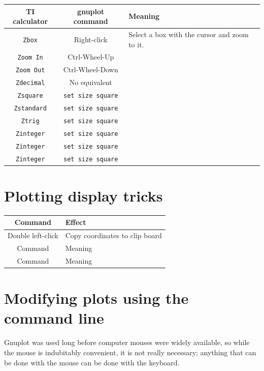 \documentclass[11pt,letterpaper]{report}
\begin{document}
\begin{center}
	\begin{tabular}{|c|c|l|}
	\hline 
	TI calculator & gnuplot command & Meaning \\ 
	\hline 
	\verb+Zbox+ & Right-click  & Select a box with the cursor and zoom to it. \\
	\hline
	\verb+Zoom In+ & Ctrl-Wheel-Up & \\
	\hline
	\verb+Zoom Out+ & Ctrl-Wheel-Down & \\
	\hline
	\verb+Zdecimal+ & No equivalent & \\
	\hline
	\verb+Zsquare+ & \lstinline+set size square+ & \\
	\hline
	\verb+Zstandard+ & \lstinline+set size square+ & \\
	\hline
	\verb+Ztrig+ & \lstinline+set size square+ & \\
	\hline
	\verb+Zinteger+ & \lstinline+set size square+ & \\
	\hline
	\verb+Zinteger+ & \lstinline+set size square+ & \\
	\hline
	\verb+Zinteger+ & \lstinline+set size square+ & \\
	\hline
	\end{tabular}
\end{center}


\section{Plotting display tricks}

\begin{center}
	\begin{tabular}{|c|l|}
	\hline 
	Command & Effect \\
	\hline
	Double left-click & Copy coordinates to clip board \\
	\hline
	Command & Meaning \\
	\hline
	Command & Meaning \\
	\hline
	\end{tabular}
\end{center}

\section{Modifying plots using the command line}

Gnuplot was used long before computer mouses were widely available, so while the mouse is indubitably convenient, it is not really necessary; anything that can be done with the mouse can be done with the keyboard.
\end{document}
